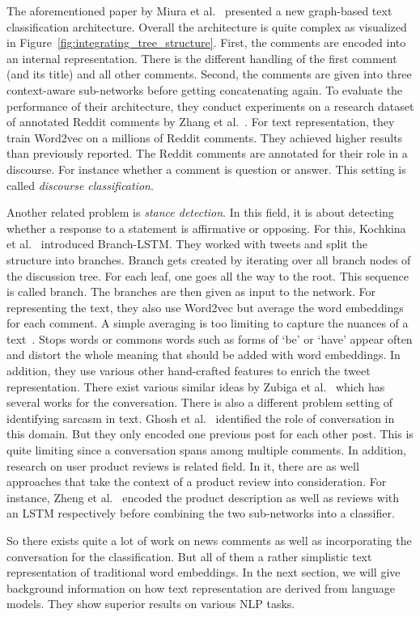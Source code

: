 \newpage

The aforementioned paper by Miura et al.~\cite{C18-1322} presented a new graph-based text classification architecture. Overall the architecture is quite complex as visualized in Figure~\ref{fig:integrating_tree_structure}. First, the comments are encoded into an internal representation. There is the different handling of the first comment (and its title) and all other comments. Second, the comments are given into three context-aware sub-networks before getting concatenating again. To evaluate the performance of their architecture, they conduct experiments on a research dataset of annotated Reddit comments by Zhang et al.~\cite{coarsediscourse}. For text representation, they train Word2vec on a millions of Reddit comments. They achieved higher results than previously reported. The Reddit comments are annotated for their role in a discourse. For instance whether a comment is question or answer. This setting is called \textit{discourse classification}.

Another related problem is \textit{stance detection}. In this field, it is about detecting whether a response to a statement is affirmative or opposing. For this, Kochkina et al.~\cite{kochkina2017turing} introduced Branch-LSTM. They worked with tweets and split the structure into branches. Branch gets created by iterating over all branch nodes of the discussion tree. For each leaf, one goes all the way to the root. This sequence is called branch. The branches are then given as input to the network. For representing the text, they also use Word2vec but average the word embeddings for each comment. A simple averaging is too limiting to capture the nuances of a text~\cite{rueckle:2018}.
 Stops words or commons words such as forms of `be' or `have' appear often and distort the whole meaning that should be added with word embeddings.
In addition, they use various other hand-crafted features to enrich the tweet representation. There exist various similar ideas by Zubiga et al.~\cite{C16-1230, ZUBIAGA2018273} which has several works for the conversation.
There is also a different problem setting of identifying sarcasm in text.
Ghosh et al.~\cite{W17-5523} identified the role of conversation in this domain.
But they only encoded one previous post for each other post.
This is quite limiting since a conversation spans among multiple comments.
In addition, research on user product reviews is related field.
In it, there are as well approaches that take the context of a product review into consideration.
For instance, Zheng et al.~\cite{Zheng:2017:JDM:3018661.3018665} encoded the product description as well as reviews with an LSTM respectively before combining the two sub-networks into a classifier.

So there exists quite a lot of work on news comments as well as incorporating the conversation for the classification. But all of them a rather simplistic text representation of traditional word embeddings. In the next section, we will give background information on how text representation are derived from language models. They show superior results on various NLP tasks.
